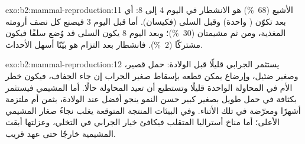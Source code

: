 \begin{solution}{exo:b2:mammal-reproduction:11}
الأشيع (\qty{68}{\%}) هو الانشطار في اليوم 4 إلى 8: أي بعد
تكوّن  ( واحدة) وقبل السلى
(فكيسان). أما قبل اليوم 3 فيصنع كل نصف أرومته المغذية،
ومن ثم مشيمتان (\qty{30}{\%})؛ وبعد اليوم 8 يكون السلى
قد وُضع سلفًا فيكون مشتركًا (\qty{2}{\%}). فانشطار  بعد التزام  هو بيّنًا
أسهل الأحداث.
\end{solution}

\begin{solution}{exo:b2:mammal-reproduction:12}
يستثمر الجرابي قليلًا قبل الولادة: حمل قصير، وصغير
ضئيل، وإرضاع يمكن قطعه بإسقاط صغير الجراب
إن جاء الجفاف، فيكون خطر الأم في المحاولة الواحدة قليلًا
وتستطيع أن تعيد المحاولة حالًا. أما المشيمي فيستثمر بكثافة في
حمل طويل بصغير كبير حسن النمو ينجو أفضل
عند الولادة، بثمن أم ملتزمة أشهرًا
ومعرّضة في تلك الأثناء. وفي البيئات المنتجة المتوقعة يغلب
نجاءُ صغار المشيمي الأعلى؛ أما مناخ أستراليا المتقلب
فيكافئ خيار الجرابي في التخلي، وعزلتها
أبقت المشيمية خارجًا حتى عهد قريب.
\end{solution}

